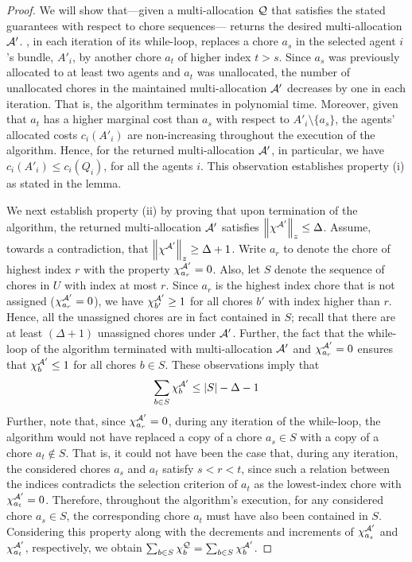 \begin{proof}
    We will show that---given a multi-allocation $\mathcal{Q}$ that satisfies the stated guarantees with respect to chore sequences--- returns the desired multi-allocation $\mathcal{A}'$. , in each iteration of its while-loop, replaces a chore $a_s$ in the selected agent $i$'s bundle, $A'_i$, by another chore $a_t$ of higher index $t > s$. Since $a_s$ was previously allocated to at least two agents and $a_t$ was unallocated, the number of unallocated chores in the maintained multi-allocation $\mathcal{A}'$ decreases by one in each iteration. That is, the algorithm terminates in polynomial time. Moreover, given that $a_t$ has a higher marginal cost than $a_s$ with respect to $A'_i \setminus \{a_s\}$, the agents' allocated costs $c_i(A'_i)$ are non-increasing throughout the execution of the algorithm. Hence, for the returned multi-allocation $\mathcal{A}'$, in particular, we have $c_i(A'_i) \leq c_i(Q_i)$, for all the agents $i$. This observation establishes property (i) as stated in the lemma. 
    
    
    We next establish property (ii) by proving that upon termination of the algorithm, the returned multi-allocation $\mathcal{A}'$ satisfies $\left\|\chi^{\mathcal{A}'}\right\|_z \leq \Delta$. Assume, towards a contradiction, that $\left\|\chi^{\mathcal{A}'}\right\|_z\geq \Delta+1$. Write $a_r$ to denote the chore of highest index $r$ with the property $\chi^{\mathcal{A}'}_{a_r}=0$. Also, let $S$ denote the sequence of chores in $U$ with index at most $r$. Since $a_r$ is the highest index chore that is not assigned ($\chi^{\mathcal{A}'}_{a_r}=0$), we have $\chi^{\mathcal{A}'}_{b'} \geq 1$ for all chores $b'$ with index higher than $r$. Hence, all the unassigned chores are in fact contained in $S$; recall that there are at least $(\Delta +1)$ unassigned chores under $\mathcal{A}'$. Further, the fact that the while-loop of the algorithm terminated with multi-allocation $\mathcal{A}'$ and $\chi^{\mathcal{A}'}_{a_r}=0$ ensures that $\chi^{\mathcal{A}'}_b \leq 1$ for all chores $b \in S$. These observations imply that 
    \begin{align}
        \sum_{b \in S} \chi^{\mathcal{A}'}_b \leq |S| - \Delta -1 \label{ineq:prefix-delta}
    \end{align}
    Further, note that, since $\chi^{\mathcal{A}'}_{a_r} = 0$, during any iteration of the while-loop, the algorithm would not have replaced a copy of a chore $a_s \in S$ with a copy of a chore $a_t \notin S$. That is, it could not have been the case that, during any iteration, the considered chores $a_s$ and $a_t$ satisfy $s < r < t$, since such a relation between the indices contradicts the selection criterion of $a_t$ as the lowest-index chore with $\chi^{\mathcal{A}'}_{a_t} = 0$. Therefore, throughout the algorithm's execution, for any considered chore $a_s \in S$, the corresponding chore $a_t$ must have also been contained in $S$. Considering this property along with the decrements and increments of $\chi^{\mathcal{A}'}_{a_s}$ and $\chi^{\mathcal{A}'}_{a_t}$, respectively, we obtain $\sum_{b \in S} \chi^{\mathcal{Q}}_b = \sum_{b \in S} \chi^{\mathcal{A}'}_b$. 


\end{proof}
